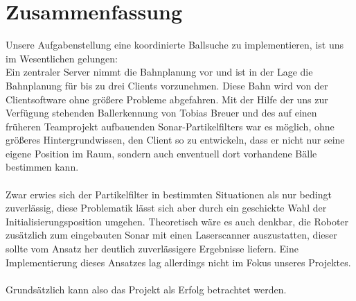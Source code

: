 
\chapter{Zusammenfassung}
\label{cha:zusammenfassung}
Unsere Aufgabenstellung eine koordinierte Ballsuche 
zu implementieren, ist uns im Wesentlichen gelungen:\\
Ein zentraler Server nimmt die Bahnplanung vor und ist in der Lage die
Bahnplanung für bis zu drei Clients vorzunehmen. Diese Bahn wird von
der Clientsoftware ohne größere Probleme abgefahren. Mit der Hilfe der
uns zur Verfügung stehenden Ballerkennung von Tobias Breuer und des
auf einen früheren Teamprojekt aufbauenden Sonar-Partikelfilters war
es möglich, ohne größeres Hintergrundwissen, den Client so zu
entwickeln, dass er nicht nur seine eigene Position im Raum, sondern
auch enventuell dort vorhandene Bälle bestimmen kann. \\\\
Zwar erwies sich der Partikelfilter in bestimmten Situationen als nur
bedingt zuverlässig, diese Problematik lässt sich aber durch ein
geschickte Wahl der Initialisierungsposition umgehen. Theoretisch wäre
es auch denkbar, die Roboter zusätzlich zum eingebauten Sonar mit
einen Laserscanner auszustatten, dieser sollte vom Ansatz her deutlich
zuverlässigere Ergebnisse liefern. Eine Implementierung dieses
Ansatzes lag allerdings nicht im Fokus unseres Projektes. \\\\
Grundsätzlich kann also das Projekt als Erfolg betrachtet werden.
